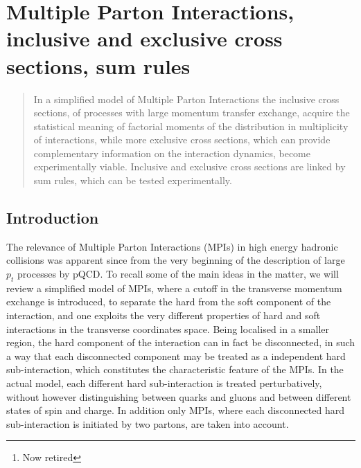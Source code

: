 \documentclass{ws-rv9x6}
\begin{document}
\chapter[Using World Scientific's Review Volume Document Style]{Multiple Parton Interactions, inclusive and exclusive cross sections, sum rules}
\label{ra_ch1}

\author[D. Treleani and G. Calucci]{D. Treleani and G. Calucci\footnote{Now retired}}

\address{Dipartimento di
Fisica dell'Universit\`a di Trieste and INFN, Sezione di
Trieste,\\
Strada Costiera 11, Miramare-Grignano, I-34014 Trieste,
Italy.}



\begin{abstract}
In a simplified model of Multiple Parton Interactions the
inclusive cross sections, of processes with large momentum transfer exchange, acquire the statistical meaning of factorial moments of the
distribution in multiplicity of interactions, while more
exclusive cross sections, which can provide
complementary information on the interaction dynamics, become experimentally viable. Inclusive and exclusive cross sections are linked by sum rules, which can be tested experimentally.
\end{abstract}

\body


\section{Introduction}

The relevance of Multiple Parton Interactions (MPIs) in high energy hadronic collisions was apparent since from the very beginning of the description of large $p_t$ processes by pQCD\cite{Paver:1982yp, Humpert:1983pw, Mekhfi:1983az, Mekhfi:1985dv}. To recall some of the main ideas in the matter, we will review a simplified model of MPIs, where a cutoff in the transverse momentum exchange is introduced, to separate the hard from the soft component of the interaction, and one exploits the very different properties of hard and soft interactions in the transverse coordinates space. Being localised in a smaller region, the hard component of the interaction can in fact be disconnected, in such a way that each disconnected component may be treated as a independent hard sub-interaction, which constitutes the characteristic feature of the MPIs. In the actual model, each different hard sub-interaction is treated perturbatively, without however distinguishing between quarks and gluons and between different states of spin and charge. In addition only MPIs, where each disconnected hard sub-interaction is initiated by two partons, are taken into account. 
\end{document}
